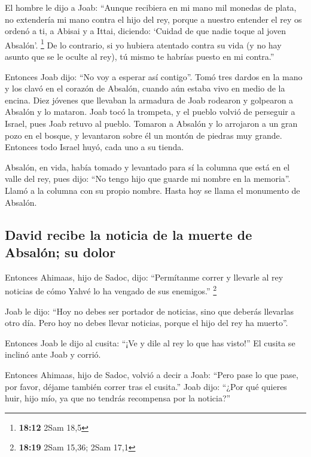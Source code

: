 \begin{paracol}{2}
 El hombre le dijo a Joab: ``Aunque recibiera en mi mano
mil monedas de plata, no extendería mi mano contra el hijo del rey,
porque a nuestro entender el rey os ordenó a ti, a Abisai y a Ittai,
diciendo: `Cuidad de que nadie toque al joven Absalón'. \footnote{\textbf{18:12}
  2Sam 18,5}  De lo contrario, si yo hubiera atentado
contra su vida (y no hay asunto que se le oculte al rey), tú mismo te
habrías puesto en mi contra.''

 Entonces Joab dijo: ``No voy a esperar así contigo''.
Tomó tres dardos en la mano y los clavó en el corazón de Absalón, cuando
aún estaba vivo en medio de la encina.  Diez jóvenes que
llevaban la armadura de Joab rodearon y golpearon a Absalón y lo
mataron.  Joab tocó la trompeta, y el pueblo volvió de
perseguir a Israel, pues Joab retuvo al pueblo.  Tomaron
a Absalón y lo arrojaron a un gran pozo en el bosque, y levantaron sobre
él un montón de piedras muy grande. Entonces todo Israel huyó, cada uno
a su tienda.

 Absalón, en vida, había tomado y levantado para sí la
columna que está en el valle del rey, pues dijo: ``No tengo hijo que
guarde mi nombre en la memoria''. Llamó a la columna con su propio
nombre. Hasta hoy se llama el monumento de Absalón.

\hypertarget{david-recibe-la-noticia-de-la-muerte-de-absaluxf3n-su-dolor}{%
\subsection{David recibe la noticia de la muerte de Absalón; su
dolor}\label{david-recibe-la-noticia-de-la-muerte-de-absaluxf3n-su-dolor}}

 Entonces Ahimaas, hijo de Sadoc, dijo: ``Permítanme
correr y llevarle al rey noticias de cómo Yahvé lo ha vengado de sus
enemigos.'' \footnote{\textbf{18:19} 2Sam 15,36; 2Sam 17,1}

 Joab le dijo: ``Hoy no debes ser portador de noticias,
sino que deberás llevarlas otro día. Pero hoy no debes llevar noticias,
porque el hijo del rey ha muerto''.

 Entonces Joab le dijo al cusita: ``¡Ve y dile al rey lo
que has visto!'' El cusita se inclinó ante Joab y corrió.

 Entonces Ahimaas, hijo de Sadoc, volvió a decir a Joab:
``Pero pase lo que pase, por favor, déjame también correr tras el
cusita.'' Joab dijo: ``¿Por qué quieres huir, hijo mío, ya que no
tendrás recompensa por la noticia?''


\end{paracol}
